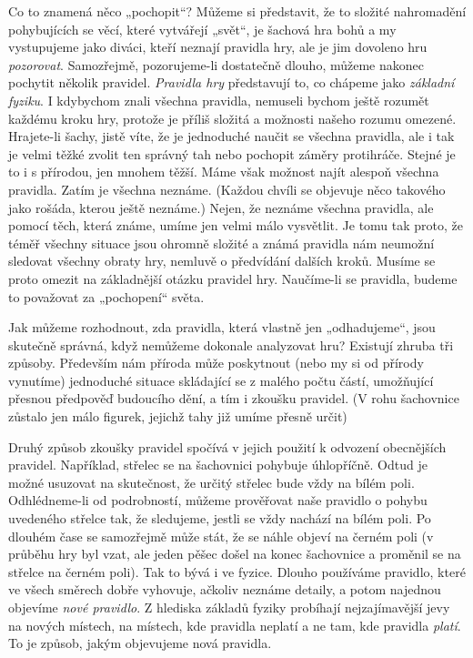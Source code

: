     Co to znamená něco „pochopit“? Můžeme si představit, že to složité nahromadění pohybujících se věcí, 
    které vytvářejí „svět“, je šachová hra bohů a my vystupujeme jako diváci, kteří neznají pravidla hry, ale 
    je jim dovoleno hru \emph{pozorovat}. Samozřejmě, pozorujeme-li dostatečně dlouho, můžeme nakonec 
    pochytit několik pravidel. \emph{Pravidla hry} představují to, co chápeme jako \emph{základní fyziku}. I 
    kdybychom znali všechna pravidla, nemuseli bychom ještě rozumět každému kroku hry, protože je příliš 
    složitá a možnosti našeho rozumu omezené. Hrajete-li šachy, jistě víte, že je jednoduché naučit se 
    všechna pravidla, ale i tak je velmi těžké zvolit ten správný tah nebo pochopit záměry protihráče. Stejné 
    je to i s přírodou, jen mnohem těžší. Máme však možnost najít alespoň všechna pravidla. Zatím je všechna 
    neznáme. (Každou chvíli se objevuje něco takového jako rošáda, kterou ještě neznáme.) Nejen, že neznáme 
    všechna pravidla, ale pomocí těch, která známe, umíme jen velmi málo vysvětlit. Je tomu tak proto, že 
    téměř všechny situace jsou ohromně složité a známá pravidla nám neumožní sledovat všechny obraty hry, 
    nemluvě o předvídání dalších kroků. Musíme se proto omezit na základnější otázku pravidel hry. Naučíme-li 
    se pravidla, budeme to považovat za „pochopení“ světa.
    
    Jak můžeme rozhodnout, zda pravidla, která vlastně jen „odhadujeme“, jsou skutečně správná, když 
    nemůžeme dokonale analyzovat hru? Existují zhruba tři způsoby. Především nám příroda může poskytnout 
    (nebo my si od přírody vynutíme) jednoduché situace skládající se z malého počtu částí, umožňující 
    přesnou předpověď budoucího dění, a tím i zkoušku pravidel. (V rohu šachovnice zůstalo jen málo figurek, 
    jejichž tahy již umíme přesně určit)
    
    Druhý způsob zkoušky pravidel spočívá v jejich použití k odvození obecnějších pravidel. Například, 
    střelec se na šachovnici pohybuje úhlopříčně. Odtud je možné usuzovat na skutečnost, že určitý střelec 
    bude vždy na bílém poli. Odhlédneme-li od podrobností, můžeme prověřovat naše pravidlo o pohybu 
    uvedeného střelce tak, že sledujeme, jestli se vždy nachází na bílém poli. Po dlouhém čase se samozřejmě 
    může stát, že se náhle objeví na černém poli (v průběhu hry byl vzat, ale jeden pěšec došel na konec 
    šachovnice a proměnil se na střelce na černém poli). Tak to bývá i ve fyzice. Dlouho používáme pravidlo, 
    které ve všech směrech dobře vyhovuje, ačkoliv neznáme detaily, a potom najednou objevíme \emph{nové 
    pravidlo}. Z hlediska základů fyziky probíhají nejzajímavější jevy na nových místech, na místech, kde 
    pravidla neplatí a ne tam, kde pravidla \emph{platí}. To je způsob, jakým objevujeme nová pravidla.
    
